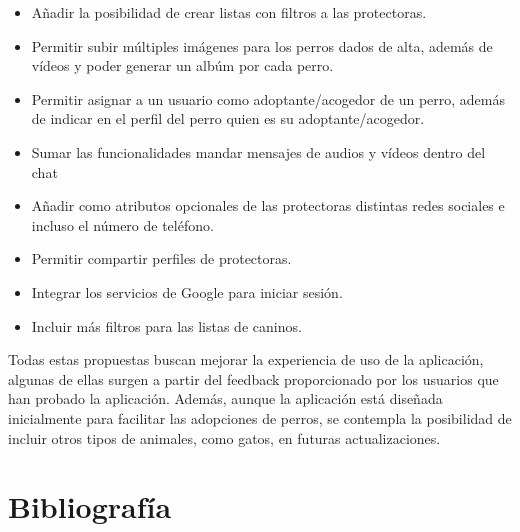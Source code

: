 \documentclass[a4paper, 12pt]{article}
\begin{document}
\begin{itemize}[noitemsep]
	\item Añadir la posibilidad de crear listas con filtros a las protectoras.
	\item Permitir subir múltiples imágenes para los perros dados de alta, además de vídeos y poder generar un albúm por cada perro.
	\item Permitir asignar a un usuario como adoptante/acogedor de un perro, además de indicar en el perfil del perro quien es su adoptante/acogedor.
	\item Sumar las funcionalidades mandar mensajes de audios y vídeos dentro del chat
	\item Añadir como atributos opcionales de las protectoras distintas redes sociales e incluso el número de teléfono.
	\item Permitir compartir perfiles de protectoras.
	\item Integrar los servicios de Google para iniciar sesión.
	\item Incluir más filtros para las listas de caninos.
\end{itemize}

Todas estas propuestas buscan mejorar la experiencia de uso de la aplicación, algunas de ellas surgen a partir del feedback proporcionado por los usuarios que han probado la aplicación. Además, aunque la aplicación está diseñada inicialmente para facilitar las adopciones de perros, se contempla la posibilidad de incluir otros tipos de animales, como gatos, en futuras actualizaciones.


\newpage
\section{Bibliografía}




\printindex
\end{document}

